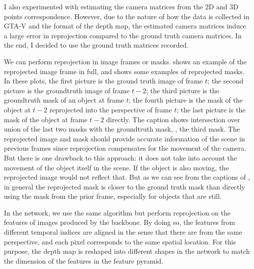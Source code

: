 I also experimented with estimating the camera matrices from the 2D and 3D points correspondence. However, due to the nature of how the data is collected in GTA-V and the format of the depth map, the estimated camera matrices induce a large error in reprojection compared to the ground truth camera matrices. In the end, I decided to use the ground truth matrices recorded. 

We can perform reprojection in image frames or masks.  shows an example of the reprojected image frame in full, and  shows some examples of reprojected masks. In these plots, the first picture is the ground truth image of frame $t$; the second picture is the groundtruth image of frame $t-2$; the third picture is the groundtruth mask of an object at frame $t$; the fourth picture is the mask of the object at $t-2$ reprojected into the perspective of frame $t$; the last picture is the mask of the object at frame $t-2$ directly. The caption shows intersection over union of the last two masks with the groundtruth mask, \ie, the third mask. The reprojected image and mask should provide accurate information of the scene in previous frames since reprojection compensates for the movement of the camera. But there is one drawback to this approach: it does not take into account the movement of the object itself in the scene. If the object is also moving, the reprojected image would not reflect that. But as we can see from the captions of , in general the reprojected mask is closer to the ground truth mask than directly using the mask from the prior frame, especially for objects that are still. 

In the network, we use the same algorithm but perform reprojection on the features of images produced by the backbone. By doing so, the features from different temporal indices are aligned in the sense that there are from the same perspective, and each pixel corresponds to the same spatial location. For this purpose, the depth map is reshaped into different shapes in the network to match the dimension of the features in the feature pyramid.

